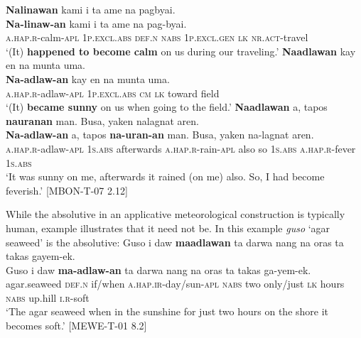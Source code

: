 \ea
\label{ex:travelling}
\textbf{Nalinawan}  kami  i  ta  ame  na  pagbyai. \\\smallskip
\gll \textbf{Na-linaw-an}  kami  i  ta  ame  na  pag-byai. \\
\textsc{a.hap.r}-calm-\textsc{apl}  1\textsc{p.excl.abs}  \textsc{def.n}  \textsc{nabs}  1\textsc{p.excl.gen}  \textsc{lk}  \textsc{nr.act}-travel \\
\glt ‘(It) \textbf{happened to become calm} on us during our traveling.’
\z
\ea
\textbf{Naadlawan}  kay  en  na  munta  uma. \\\smallskip
\gll \textbf{Na-adlaw-an}  kay  en  na  munta  uma. \\
\textsc{a.hap.r}-adlaw-\textsc{apl}  1\textsc{p.excl.abs}  \textsc{cm}  \textsc{lk}  toward  field \\
\glt ‘(It) \textbf{became sunny} on us when going to the field.’
\z
\ea
\textbf{Naadlawan}  a,  tapos  \textbf{nauranan}  man.  Busa, yaken  nalagnat  aren. \\\smallskip
\gll \textbf{Na-adlaw-an}  a,  tapos  \textbf{na-uran-an}  man.  Busa, yaken  na-lagnat  aren. \\
\textsc{a.hap.r}-adlaw-\textsc{apl}  1\textsc{s.abs}  afterwards  \textsc{a.hap.r}-rain-\textsc{apl}  also  so
1\textsc{s.abs}  \textsc{a.hap.r}-fever  1\textsc{s.abs} \\
\glt `It was sunny on me, afterwards it rained (on me) also. So, I had become feverish.’ [MBON-T-07 2.12]
\z

While the absolutive in an applicative meteorological construction is typically human, example  illustrates that it need not be. In this example \textit{guso} ‘agar seaweed’ is the absolutive: 
\ea
\label{ex:seaweed}
Guso  i  daw  \textbf{maadlawan}  ta  darwa  nang  na  oras ta  takas  gayem-ek. \\\smallskip
\gll Guso  i  daw  \textbf{ma-adlaw-an}  ta  darwa  nang  na  oras ta  takas  ga-yem-ek. \\
agar.seaweed  \textsc{def.n}  if/when  \textsc{a.hap.ir}-day/sun-\textsc{apl}  \textsc{nabs}  two  only/just  \textsc{lk}  hours \textsc{nabs}  up.hill  \textsc{i.r}-soft \\
\glt `The agar seaweed when in the sunshine for just two hours on the shore it becomes soft.’ [MEWE-T-01 8.2]
\z

